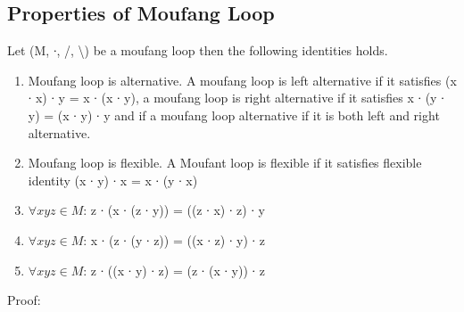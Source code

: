 \subsection{Properties of Moufang Loop}
Let (M, ∙, /, \textbackslash ) be a moufang loop then the following identities
holds.
\begin{enumerate}
\item Moufang loop is alternative. A moufang loop is left alternative if it satisfies (x ∙ x) ∙ y = x ∙ (x ∙ y), a moufang loop is right alternative if it satisfies x ∙ (y ∙ y) = (x ∙ y) ∙ y and if a moufang loop alternative if it is both left and right alternative. 
\item Moufang loop is flexible. A Moufant loop is flexible if it satisfies flexible identity (x ∙ y) ∙ x = x ∙ (y ∙ x)
\item \(\forall x y z \in M\): z ∙ (x ∙ (z ∙ y)) = ((z ∙ x) ∙ z) ∙ y
\item \(\forall x y z \in M\): x ∙ (z ∙ (y ∙ z)) = ((x ∙ z) ∙ y) ∙ z 
\item \(\forall x y z \in M\): z ∙ ((x ∙ y) ∙ z) = (z ∙ (x ∙ y)) ∙ z 
\end{enumerate}
Proof:
